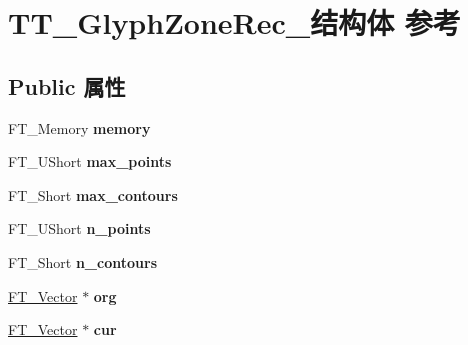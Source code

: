 \hypertarget{struct_t_t___glyph_zone_rec__}{}\section{T\+T\+\_\+\+Glyph\+Zone\+Rec\+\_\+结构体 参考}
\label{struct_t_t___glyph_zone_rec__}
\subsection*{Public 属性}
\begin{DoxyCompactItemize}
\item 
\mbox{\label{struct_t_t___glyph_zone_rec___adc8cac6d6d8475aa50946d6bc17fd345}} 
F\+T\+\_\+\+Memory {\bfseries memory}
\item 
\mbox{\label{struct_t_t___glyph_zone_rec___aa06aa1bfd1b7e2082552ea24f96c775e}} 
F\+T\+\_\+\+U\+Short {\bfseries max\+\_\+points}
\item 
\mbox{\label{struct_t_t___glyph_zone_rec___adf1671187fe804f0a117edb76f8cfd12}} 
F\+T\+\_\+\+Short {\bfseries max\+\_\+contours}
\item 
\mbox{\label{struct_t_t___glyph_zone_rec___a2acc389958f0e593f7eed29f7ca15b94}} 
F\+T\+\_\+\+U\+Short {\bfseries n\+\_\+points}
\item 
\mbox{\label{struct_t_t___glyph_zone_rec___a1aa2ffa863fbd8a8985fe3e39e8bb92a}} 
F\+T\+\_\+\+Short {\bfseries n\+\_\+contours}
\item 
\mbox{\label{struct_t_t___glyph_zone_rec___a240879d0a1a6dd487b84f3b3723f9058}} 
\hyperlink{struct_f_t___vector__}{F\+T\+\_\+\+Vector} $\ast$ {\bfseries org}
\item 
\mbox{\label{struct_t_t___glyph_zone_rec___a5dc4b386729ab85619a7132f69714991}} 
\hyperlink{struct_f_t___vector__}{F\+T\+\_\+\+Vector} $\ast$ {\bfseries cur}
\item 
\mbox{\label{struct_t_t___glyph_zone_rec___a4b4193dbae177435cb6515f9a0537fa0}} 

\end{DoxyCompactItemize}
